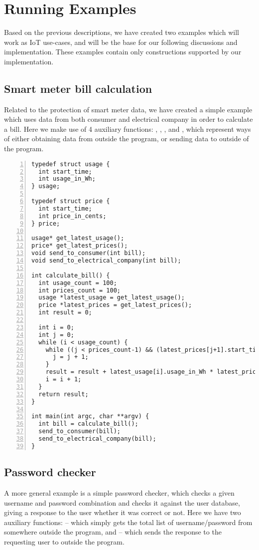 
\section{Running Examples}
Based on the previous descriptions, we have created two examples which will work as IoT use-cases, and will be the base for our following discussions and implementation.
These examples contain only constructions supported by our implementation.

\subsection{Smart meter bill calculation}
Related to the protection of smart meter data, we have created a simple example which uses data from both consumer and electrical company in order to calculate a bill.
Here we make use of 4 auxiliary functions: , , , and , which represent ways of either obtaining data from outside the program, or sending data to outside of the program.

\begin{lstlisting}[style=dlmc, numbers=left]
typedef struct usage {
  int start_time;
  int usage_in_Wh;
} usage;

typedef struct price {
  int start_time;
  int price_in_cents;
} price;

usage* get_latest_usage();
price* get_latest_prices();
void send_to_consumer(int bill);
void send_to_electrical_company(int bill);

int calculate_bill() {
  int usage_count = 100;
  int prices_count = 100;
  usage *latest_usage = get_latest_usage();
  price *latest_prices = get_latest_prices();
  int result = 0;

  int i = 0;
  int j = 0;
  while (i < usage_count) {
    while ((j < prices_count-1) && (latest_prices[j+1].start_time <= latest_usage[i].start_time)) {
      j = j + 1;
    }
    result = result + latest_usage[i].usage_in_Wh * latest_prices[j].price_in_cents;
    i = i + 1;
  }
  return result;
}

int main(int argc, char **argv) {
  int bill = calculate_bill();
  send_to_consumer(bill);
  send_to_electrical_company(bill);
}
\end{lstlisting}

\subsection{Password checker}
A more general example is a simple password checker, which checks a given username and password combination and checks it against the user database, giving a response to the user whether it was correct or not.
Here we have two auxiliary functions:  -- which simply gets the total list of username/password from somewhere outside the program, and  -- which sends the response to the requesting user to outside the program.

